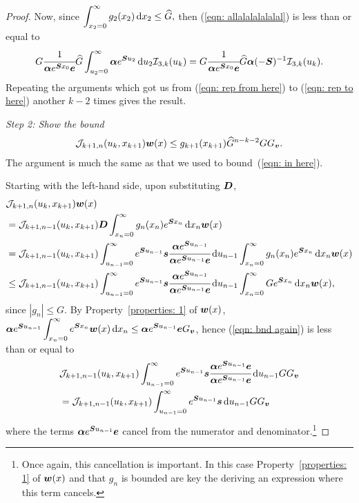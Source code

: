 \begin{proof}
	Now, since \(\displaystyle \int_{x_2=0}^\infty g_2(x_2)\, \mathrm{d} x_2\leq \widehat G,\) then (\ref{eqn: allalalalalalal}) is less than or equal to 
	\begin{align}
		G  \cfrac{1}{\boldsymbol \alpha e^{\boldsymbol{S} x_0 }\boldsymbol e}  \widehat G  \int_{u_2=0}^\infty \boldsymbol \alpha e^{\boldsymbol{S}u_2} \, \mathrm{d} u_2 \mathcal I_{3,k}(u_k) 
		=G  \cfrac{1}{\boldsymbol \alpha e^{\boldsymbol{S} x_0 }\boldsymbol e}  \widehat G \boldsymbol \alpha (-\boldsymbol S)^{-1} \mathcal I_{3,k}(u_k).  \label{eqn: rep to here}
	\end{align}
	Repeating the arguments which got us from (\ref{eqn: rep from here}) to (\ref{eqn: rep to here}) another \(k-2\) times gives the result.

\emph{Step 2: Show the bound}
	\begin{align}
            	\mathcal J_{k+1,n}(u_k,x_{k+1})  {\boldsymbol w}(x) \leq  g_{k+1}(x_{k+1})\widehat G^{n-k-2} G G_{\boldsymbol v}. \label{eqn: J bound}
	\end{align}
	The argument is much the same as that we used to bound~(\ref{eqn: in here}).

	Starting with the left-hand side, upon substituting \(\boldsymbol{D}\), 
	\begin{align}
		& \mathcal J_{k+1,n}(u_k,x_{k+1})  {\boldsymbol w}(x)  \nonumber 
		\\&= \mathcal J_{k+1,n-1}(u_k,x_{k+1})  \boldsymbol{D}
		\int_{x_n=0}^\infty g_{n}(x_n) e^{\boldsymbol{S}x_n} \, \mathrm{d} x_n{\boldsymbol w}(x) \nonumber
		\\&= \mathcal J_{k+1,n-1}(u_k,x_{k+1})  \int_{u_{n-1}=0}^\infty e^{\boldsymbol{S}u_{n-1}}\boldsymbol s \cfrac{\boldsymbol \alpha e^{\boldsymbol{S}u_{n-1}}}{\boldsymbol \alpha e^{\boldsymbol{S}u_{n-1}}\boldsymbol e}\, \mathrm{d}  u_{n-1}
		\int_{x_n=0}^\infty g_{n}(x_n) e^{\boldsymbol{S}x_n} \, \mathrm{d} x_n{\boldsymbol w}(x) \nonumber
		\\&\leq \mathcal J_{k+1,n-1}(u_k,x_{k+1})  \int_{u_{n-1}=0}^\infty e^{\boldsymbol{S}u_{n-1}}\boldsymbol s \cfrac{\boldsymbol \alpha e^{\boldsymbol{S}u_{n-1}}}{\boldsymbol \alpha e^{\boldsymbol{S}u_{n-1}}\boldsymbol e}\, \mathrm{d}  u_{n-1}
		\int_{x_n=0}^\infty G e^{\boldsymbol{S}x_n} \, \mathrm{d} x_n{\boldsymbol w}(x), \label{eqn: bnd again}
	\end{align}
	since \(|g_n|\leq G\). 
	By Property~\ref{properties: 1} of \({\boldsymbol w}(x)\), \(\boldsymbol \alpha e^{\boldsymbol{S}u_{n-1}} \displaystyle\int_{x_n=0}^\infty e^{\boldsymbol{S}x_n} {\boldsymbol w}(x) \, \mathrm{d} x_n  \leq \boldsymbol \alpha e^{\boldsymbol{S}u_{n-1}}\boldsymbol eG_{\boldsymbol v}\), hence (\ref{eqn: bnd again}) is less than or equal to 
	\begin{align}
		&\mathcal J_{k+1,n-1}(u_k,x_{k+1})  \int_{u_{n-1}=0}^\infty e^{\boldsymbol{S}u_{n-1}}\boldsymbol s \cfrac{\boldsymbol \alpha e^{\boldsymbol{S}u_{n-1}}\boldsymbol e}{\boldsymbol \alpha e^{\boldsymbol{S}u_{n-1}}\boldsymbol e}\, \mathrm{d}  u_{n-1} G  G_{\boldsymbol v}\nonumber 
		\\& = \mathcal J_{k+1,n-1}(u_k,x_{k+1})  \int_{u_{n-1}=0}^\infty e^{\boldsymbol{S}u_{n-1}}\boldsymbol s \, \mathrm{d}  u_{n-1} G  G_{\boldsymbol v}\label{eqn: jjjjjjjj}
	\end{align}
	where the terms \(\boldsymbol \alpha e^{\boldsymbol{S}u_{n-1}}\boldsymbol e\) cancel from the numerator and denominator.\footnote{Once again, this cancellation is important. In this case Property~\ref{properties: 1} of \(\boldsymbol w(x)\) and that \(g_n\) is bounded are key the deriving an expression where this term cancels.}


\end{proof}
